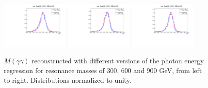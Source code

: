 \begin{figure}[thb]
  \centering
  \includegraphics[trim={0 0 0 0.95cm},clip,width=0.3\textwidth]{figures/sec-photons/mgg_Rad300_13TeV_EBHighR9.pdf}\hfil
  \includegraphics[trim={0 0 0 0.95cm},clip,width=0.3\textwidth]{figures/sec-photons/mgg_Rad600_13TeV_EBHighR9.pdf}\hfil
  \includegraphics[trim={0 0 0 0.95cm},clip,width=0.3\textwidth]{figures/sec-photons/mgg_Rad900_13TeV_EBHighR9.pdf}\hfil
  \caption{$M(\gamma\gamma)$ reconstructed with different versions of the photon energy regression for resonance masses of 300, 600 and 900 GeV, from left to right. Distributions normalized to unity.}
  \label{fig:pho_reg}
\end{figure}
